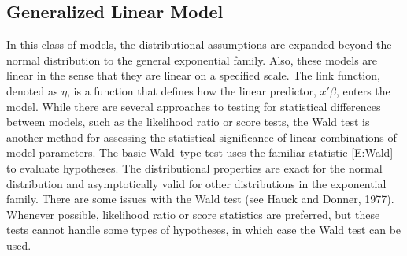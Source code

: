 \documentclass[12pt]{article}
\begin{document}
\subsection{Generalized Linear Model}

In this class of models, the distributional assumptions are expanded beyond the normal distribution to the general exponential family. Also, these models are linear in the sense that they are linear on a specified scale. The link function, denoted as $\eta$, is a function that defines how the linear predictor, $x'\beta$, enters the model. While there are several approaches to testing for statistical differences between models, such as the likelihood ratio or score tests, the Wald test is another method for assessing the statistical significance of linear combinations of model parameters. The basic Wald--type test uses the familiar statistic \ref{E:Wald} to evaluate hypotheses. The distributional properties are exact for the normal distribution and asymptotically valid for other distributions in the exponential family. There are some issues with the Wald test (see Hauck and Donner, 1977). Whenever possible, likelihood ratio or score statistics are preferred, but these tests cannot handle some types of hypotheses, in which case the Wald test can be used.
\end{document}
